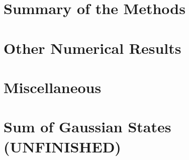 \documentclass[a4paper,11pt,english]{report}
\begin{document}
\chapter{Summary of the Methods} \label{summ-all-meths}
    
    
\chapter{Other Numerical Results}
    
    
\chapter{Miscellaneous} \label{misc-app}
    

\chapter{Sum of Gaussian States \color{red}(UNFINISHED)\color{black}} \label{app-squeeze}
    
    
\end{document}
